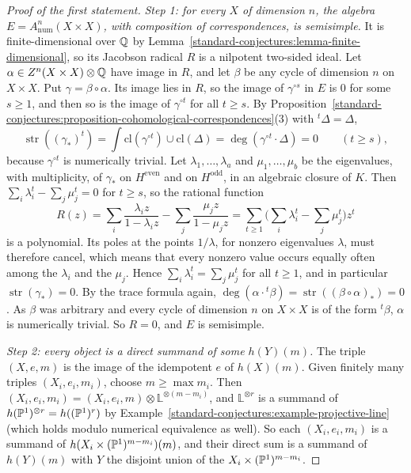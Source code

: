 \begin{proof}[Proof of the first statement]
\emph{Step 1: for every $X$ of dimension $n$, the algebra $E = A^n_{\mathrm{num}}(X \times X)$, with composition of correspondences, is semisimple.} It is finite-dimensional over $\mathbb{Q}$ by
Lemma~\ref{standard-conjectures:lemma-finite-dimensional}, so its Jacobson radical $R$ is a nilpotent two-sided ideal. Let $\alpha \in Z^n(X \times X) \otimes \mathbb{Q}$ have image in $R$, and let $\beta$ be any cycle of
dimension $n$ on $X \times X$. Put $\gamma = \beta \circ \alpha$. Its image lies in $R$, so the image of $\gamma^{\circ s}$ in $E$ is $0$ for some $s \geq 1$, and then so is the image of $\gamma^{\circ t}$ for all $t \geq s$.
By Proposition~\ref{standard-conjectures:proposition-cohomological-correspondences}(3) with ${}^t\Delta = \Delta$,
\[
\operatorname{str}((\gamma_*)^t) = \int\mathrm{cl}(\gamma^{\circ t}) \cup \mathrm{cl}(\Delta) = \deg(\gamma^{\circ t} \cdot \Delta) = 0 \qquad (t \geq s),
\]
because $\gamma^{\circ t}$ is numerically trivial. Let $\lambda_1, \ldots, \lambda_a$ and $\mu_1, \ldots, \mu_b$ be the eigenvalues, with multiplicity, of $\gamma_*$ on $H^{\mathrm{even}}$ and on $H^{\mathrm{odd}}$, in an algebraic closure of $K$.
Then $\sum_i\lambda_i^t - \sum_j\mu_j^t = 0$ for $t \geq s$, so the rational function
\[
R(z) = \sum_i\frac{\lambda_iz}{1 - \lambda_iz} - \sum_j\frac{\mu_jz}{1 - \mu_jz} = \sum_{t \geq 1}\Big(\sum_i\lambda_i^t - \sum_j\mu_j^t\Big)z^t
\]
is a polynomial. Its poles at the points $1/\lambda$, for nonzero eigenvalues $\lambda$, must therefore cancel, which means that every nonzero value occurs equally often among the $\lambda_i$ and the $\mu_j$. Hence
$\sum_i\lambda_i^t = \sum_j\mu_j^t$ for all $t \geq 1$, and in particular $\operatorname{str}(\gamma_*) = 0$. By the trace formula again, $\deg(\alpha \cdot {}^t\beta) = \operatorname{str}((\beta \circ \alpha)_*) = 0$. As
$\beta$ was arbitrary and every cycle of dimension $n$ on $X \times X$ is of the form ${}^t\beta$, $\alpha$ is numerically trivial. So $R = 0$, and $E$ is semisimple.

\emph{Step 2: every object is a direct summand of some $h(Y)(m)$.} The triple $(X, e, m)$ is the image of the idempotent $e$ of $h(X)(m)$. Given finitely many triples $(X_i, e_i, m_i)$, choose $m \geq \max m_i$. Then
$(X_i, e_i, m_i) = (X_i, e_i, m) \otimes \mathbb{L}^{\otimes(m - m_i)}$, and $\mathbb{L}^{\otimes r}$ is a summand of $h(\mathbb{P}^1)^{\otimes r} = h((\mathbb{P}^1)^r)$ by Example~\ref{standard-conjectures:example-projective-line} (which
holds modulo numerical equivalence as well). So each $(X_i, e_i, m_i)$ is a summand of $h(X_i \times (\mathbb{P}^1)^{m-m_i})(m)$, and their direct sum is a summand of $h(Y)(m)$ with $Y$ the disjoint union of the
$X_i \times (\mathbb{P}^1)^{m-m_i}$.


\end{proof}
